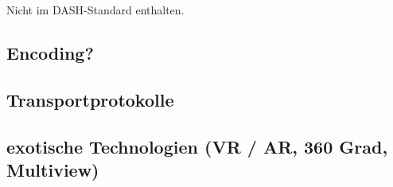 \documentclass[paper = a4, fontsize = 12pt, parskip = half]{scrartcl} %
\begin{document}
Nicht im DASH-Standard enthalten. 

\subsection{Encoding?}

\subsection{Transportprotokolle}

\subsection{exotische Technologien (VR / AR, 360 Grad, Multiview)}




 \printbibliography
\end{document}

